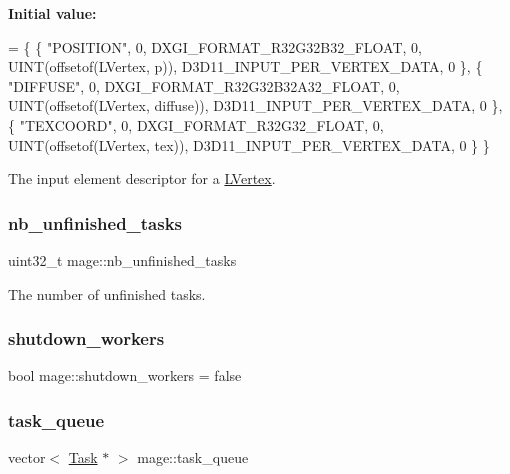 {\bfseries Initial value\+:}
\begin{DoxyCode}
= \{
        \{ \textcolor{stringliteral}{"POSITION"}, 0, DXGI\_FORMAT\_R32G32B32\_FLOAT,    0, UINT(offsetof(LVertex, p)),       
      D3D11\_INPUT\_PER\_VERTEX\_DATA, 0 \},
        \{ \textcolor{stringliteral}{"DIFFUSE"},  0, DXGI\_FORMAT\_R32G32B32A32\_FLOAT, 0, UINT(offsetof(LVertex, diffuse)), 
      D3D11\_INPUT\_PER\_VERTEX\_DATA, 0 \},
        \{ \textcolor{stringliteral}{"TEXCOORD"}, 0, DXGI\_FORMAT\_R32G32\_FLOAT,       0, UINT(offsetof(LVertex, tex)),     
      D3D11\_INPUT\_PER\_VERTEX\_DATA, 0 \}
    \}
\end{DoxyCode}
The input element descriptor for a \hyperlink{structmage_1_1_l_vertex}{L\+Vertex}. \hypertarget{namespacemage_a390e8652d67667609daf3aa64e3c00a8}{}\label{namespacemage_a390e8652d67667609daf3aa64e3c00a8} 
\subsubsection{\texorpdfstring{nb\+\_\+unfinished\+\_\+tasks}{nb\_unfinished\_tasks}}
{\footnotesize\ttfamily uint32\+\_\+t mage\+::nb\+\_\+unfinished\+\_\+tasks\hspace{0.3cm}{\ttfamily [static]}}

The number of unfinished tasks. \hypertarget{namespacemage_a2342ab1ffdf94509ba4f9683189a1898}{}\label{namespacemage_a2342ab1ffdf94509ba4f9683189a1898} 
\subsubsection{\texorpdfstring{shutdown\+\_\+workers}{shutdown\_workers}}
{\footnotesize\ttfamily bool mage\+::shutdown\+\_\+workers = false\hspace{0.3cm}{\ttfamily [static]}}

\hypertarget{namespacemage_a487c0bb81ed56ce18cd944e958961cdf}{}\label{namespacemage_a487c0bb81ed56ce18cd944e958961cdf} 
\subsubsection{\texorpdfstring{task\+\_\+queue}{task\_queue}}
{\footnotesize\ttfamily vector$<$ \hyperlink{classmage_1_1_task}{Task} $\ast$ $>$ mage\+::task\+\_\+queue\hspace{0.3cm}{\ttfamily [static]}}


